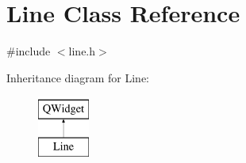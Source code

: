 \hypertarget{class_line}{}\section{Line Class Reference}
\label{class_line}


{\ttfamily \#include $<$line.\+h$>$}

Inheritance diagram for Line\+:\begin{figure}[H]
\begin{center}
\leavevmode
\includegraphics[height=2.000000cm]{class_line}
\end{center}
\end{figure}
